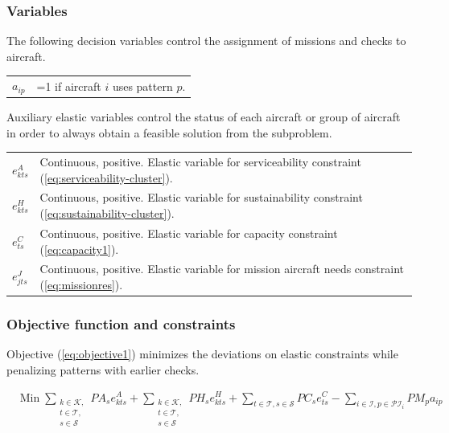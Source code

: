\documentclass[a4paper,11pt]{article}
\begin{document}
    \subsubsection{Variables}

      The following decision variables control the assignment of missions and checks to aircraft.

      \begin{tabular}{p{8mm}p{147mm}}
          $a_{ip}$ &  =1 if aircraft $i$ uses pattern $p$. \\  
      \end{tabular}

      Auxiliary elastic variables control the status of each aircraft or group of aircraft in order to always obtain a feasible solution from the subproblem.

      \begin{tabular}{p{8mm}p{147mm}}
          $e^{A}_{kts}$ & Continuous, positive. Elastic variable for serviceability constraint (\ref{eq:serviceability-cluster}). \\
          $e^{H}_{kts}$ & Continuous, positive. Elastic variable for sustainability constraint (\ref{eq:sustainability-cluster}). \\
          $e^{C}_{ts}$ & Continuous, positive. Elastic variable for capacity constraint (\ref{eq:capacity1}). \\
          $e^{J}_{jts}$ & Continuous, positive. Elastic variable for mission aircraft needs constraint (\ref{eq:missionres}). \\
      \end{tabular}

    \subsubsection{Objective function and constraints}
      Objective (\ref{eq:objective1}) minimizes the deviations on elastic constraints while penalizing patterns with earlier checks.

      \begin{align}
          & \text{Min}\; 
          \sum_{\substack{
                  k \in \mathcal{K}, \\ t \in \mathcal{T}, \\ s \in \mathcal{S}
                  }
              } PA_s e^{A}_{kts} 
          + \sum_{\substack{
                  k \in \mathcal{K}, \\ t \in \mathcal{T}, \\ s \in \mathcal{S}
                  } 
              } PH_s e^{H}_{kts}
          + \sum_{t \in \mathcal{T}, s \in \mathcal{S}} PC_s e^{C}_{ts}
          - \sum_{i \in \mathcal{I}, p \in \mathcal{PI}_i} PM_p a_{ip}
          \label{eq:objective1}
      \end{align}
\end{document}

